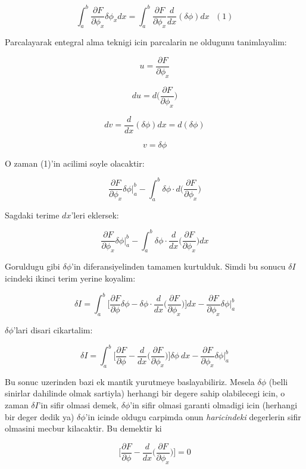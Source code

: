\documentclass[12pt,fleqn]{article}\usepackage{../common}
\begin{document}
\begin{equation} 
\int_{a}^{b} \frac{\partial F}{\partial \phi_x}\delta\phi_x dx =
\int_{a}^{b} \frac{\partial F}{\partial \phi_x} \frac{d}{dx}(\delta \phi) dx 
\ \ \ (1)
\end{equation} 

Parcalayarak entegral alma teknigi icin parcalarin ne oldugunu tanimlayalim:

\[ u = \frac{\partial F}{\partial \phi_x}  \]

\[ du  = d \bigg( \frac{\partial F}{\partial \phi_x} \bigg) \]

\[ dv  = \frac{d}{dx}(\delta \phi)dx = d(\delta \phi) \]

\[ v  = \delta \phi \]

O zaman (1)'in acilimi soyle olacaktir:

\[ 
\frac{\partial F}{\partial \phi_x} \delta \phi \bigg|_a^b - 
\int_a^b \delta \phi \cdot d \bigg( \frac{\partial F}{\partial \phi_x} \bigg)
 \]

Sagdaki terime $dx$'leri eklersek:

\[ 
\frac{\partial F}{\partial \phi_x} \delta \phi \bigg|_a^b - 
\int_a^b \delta \phi \cdot \frac{d}{dx} \bigg( \frac{\partial F}{\partial \phi_x} \bigg) dx
 \]

Goruldugu gibi $\delta \phi$'in diferansiyelinden tamamen kurtulduk. Simdi bu
sonucu $\delta I$ icindeki ikinci terim yerine koyalim:

\[ 
\delta I  = \int_{a}^{b} 
\bigg[ \frac{\partial F}{\partial \phi}\delta\phi -
\delta \phi \cdot \frac{d}{dx} \bigg( \frac{\partial F}{\partial \phi_x} \bigg)
\bigg] dx - \frac{\partial F}{\partial \phi_x} \delta \phi \bigg|_a^b 
 \]

$\delta \phi$'lari disari cikartalim:

\[ 
\delta I  = \int_{a}^{b} \bigg[
\frac{\partial F}{\partial \phi} -
\frac{d}{dx} \bigg( \frac{\partial F}{\partial \phi_x} \bigg)
\bigg] \delta\phi \ dx
- \frac{\partial F}{\partial \phi_x} \delta \phi \bigg|_a^b 
 \]

Bu sonuc uzerinden bazi ek mantik yurutmeye baslayabiliriz. Mesela $\delta \phi$
(belli sinirlar dahilinde olmak sartiyla) herhangi bir degere sahip olabilecegi
icin, o zaman $\delta I$'in sifir olmasi demek, $\delta \phi$'in sifir olmasi
garanti olmadigi icin (herhangi bir deger dedik ya) $\delta \phi$'in icinde
oldugu carpimda onun {\em haricindeki} degerlerin sifir olmasini mecbur
kilacaktir. Bu demektir ki

\[ 
\bigg[
\frac{\partial F}{\partial \phi} -
\frac{d}{dx} \bigg( \frac{\partial F}{\partial \phi_x} \bigg)
\bigg] = 0
 \]
\end{document}
